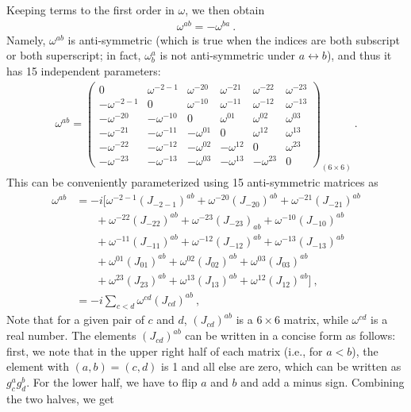 \documentclass[aps,reprint,notitlepage,nofootinbib,superscriptaddress]{revtex4-1}
\begin{document}
Keeping terms to the first order in $\omega$, we then obtain
\begin{align}
    \omega^{ab}=-\omega^{ba}~.
\end{align}
Namely, $\omega^{ab}$ is anti-symmetric (which is true when the indices are both subscript or both superscript; in fact, $\omega^a_b$ is not anti-symmetric under $a\longleftrightarrow b$), and thus it has 15
independent parameters:
\begin{align}
    \omega^{ab}=\begin{pmatrix}
     0&\omega^{-2-1}&\omega^{-20}&\omega^{-21}&\omega^{-22}&\omega^{-23}\\
     -\omega^{-2-1}&0&\omega^{-10}&\omega^{-11}&\omega^{-12}&\omega^{-13}\\
    -\omega^{-20}&-\omega^{-10}&0&\omega^{01}&\omega^{02}&\omega^{03}\\
    -\omega^{-21}&-\omega^{-11}&-\omega^{01}&0&\omega^{12}&\omega^{13}\\
    -\omega^{-22}&-\omega^{-12}&-\omega^{02}&-\omega^{12}&0&\omega^{23}\\
    -\omega^{-23}&-\omega^{-13}&-\omega^{03}&-\omega^{13}&-\omega^{23}&0
\end{pmatrix}_{(6\times6)}~.
\end{align}
This can be conveniently parameterized using 15 anti-symmetric matrices as
\begin{align}
    \omega^{ab}&=-i\bigg[\omega^{-2-1}(J_{-2-1})^{ab}+\omega^{-20}(J_{-20})^{ab}+\omega^{-21}(J_{-21})^{ab}\nonumber\\
    &~~~~~~~~+\omega^{-22}(J_{-22})^{ab}+\omega^{-23}(J_{-23})_{ab}+\omega^{-10}(J_{-10})^{ab}\nonumber\\
    &~~~~~~~~+\omega^{-11}(J_{-11})^{ab}+\omega^{-12}(J_{-12})^{ab}+\omega^{-13}(J_{-13})^{ab}\nonumber\\
    &~~~~~~~~+\omega^{01}(J_{01})^{ab}+\omega^{02}(J_{02})^{ab}+\omega^{03}(J_{03})^{ab}\nonumber\\
    &~~~~~~~~+\omega^{23}(J_{23})^{ab}+\omega^{13}(J_{13})^{ab}+\omega^{12}(J_{12})^{ab}\bigg]~,\nonumber\\
    &=-i\sum_{c<d}\omega^{cd}(J_{cd})^{ab}\label{1.84}~,
\end{align}
Note that for a given pair of $c$ and $d$, $(J_{cd})^{ab}$ is a $6\times6$ matrix, while $\omega^{cd}$ is a real number. The elements $(J_{cd})^{ab}$ can be written in a concise form as follows: first, we note that in the upper right half of each matrix (i.e., for $a < b$), the element with $(a, b) = (c,d)$ is 1 and all else are zero, which can be written as $g_c^a g_d^b$. For the lower half, we have to flip $a$ and $b$ and add a minus sign. Combining the two halves, we get
\end{document}
